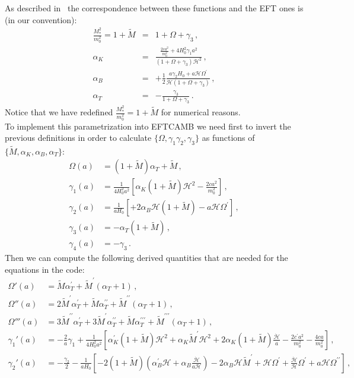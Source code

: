 \documentclass[prd,nofootinbib,showpacs]{revtex4}
\def\l{\left}
\def\r{\right}
\def\f{\frac}
\def\nn{\nonumber}
\def\hub{{\mathcal H}}
\begin{document}
{As described in~\cite{Bellini:2014fua}  the correspondence between these functions and the EFT ones is (in our convention):
 \begin{eqnarray}
\f{M_*^2}{m_0^2}=1+ \tilde{M}&=& 1+\Omega+ \gamma_3 \, , \nn \\
\alpha_K&= & \f{\f{2ca^2}{m_0^2}+4H_0^2\gamma_1a^2}{(1+\Omega+ \gamma_3)\hub^2} \, ,\nn \\
\alpha_B&=&  +\f{1}{2}\f{a\gamma_2H_0+a\hub\Omega^\prime}{\hub(1+\Omega+ \gamma_3) } \,, \nn \\
\alpha_T&=& -\f{\gamma_3}{1+\Omega+ \gamma_3} \,.
\end{eqnarray}
Notice that we have redefined $\f{M_*^2}{m_0^2}=1+ \tilde{M}$ for numerical reasons. \\
To implement this parametrization into EFTCAMB we need first to invert the previous definitions in order to calculate $\{\Omega, \gamma_1\gamma_2,\gamma_3\}$ as functions of $\{\tilde{M},\alpha_K,\alpha_B,\alpha_T\}$:
\begin{align}
\Omega(a) &= (1+ \tilde{M})\alpha_T+ \tilde{M}\,, \nonumber \\
\gamma_1(a) &= \f{1}{4H_0^2a^2}\l[\alpha_K(1+ \tilde{M})\hub^2-\f{2ca^2}{m_0^2}\r]\,,  \nonumber \\
\gamma_2(a) &=  \f{1}{aH_0}\l[+2\alpha_B\hub (1+ \tilde{M})-a\hub\Omega^\prime\r] \,,  \nonumber \\
\gamma_3(a) &= -\alpha_T(1+ \tilde{M}) \,,  \nonumber \\
\gamma_4(a) &= -\gamma_3\,.
\end{align}
%
Then we can compute the following derived quantities that are needed for the equations in the code:
\begin{align}
\Omega'(a) &=  \tilde{M}\alpha_T^\prime+ \tilde{M}^\prime(\alpha_T+1)\,,  \nonumber \\ 
\Omega''(a) &= 2\tilde{M}^\prime \alpha_T^\prime +\tilde{M}\alpha_T^{\prime\prime}+\tilde{M}^{\prime\prime}(\alpha_T+1)\,,  \nonumber \\
\Omega'''(a) &=   3\tilde{M}^{\prime\prime}\alpha_T^\prime+3\tilde{M}^\prime\alpha_T^{\prime\prime}+\tilde{M}\alpha_T^{\prime\prime\prime}+\tilde{M}^{\prime\prime\prime}(\alpha_T+1)\,,  \nonumber \\
\gamma_1'(a) &= -\f{2}{a}\gamma_1+\f{1}{4H_0^2a^2}\l[\alpha_K^\prime(1+ \tilde{M})\hub^2+\alpha_K\tilde{M}^\prime\hub^2+2\alpha_K(1+ \tilde{M})\f{\dot{\hub}}{a}-\f{2c^\prime a^2}{m_0^2}-\f{4ca}{m_0^2}\r] \,,  \nonumber \\
\gamma_2'(a) &=  -\f{\gamma_2}{2} -\f{1}{aH_0}\l[-2(1+ \tilde{M})(\alpha_B^\prime\hub+\alpha_B \f{\dot{\hub}}{a\hub}) -2\alpha_B\hub \tilde{M}^\prime+ \hub\Omega^\prime+\f{\dot{\hub}}{\hub}\Omega^\prime+a\hub\Omega^{\prime\prime}\r] \,,  \nonumber \\

\end{align}}
\end{document}
